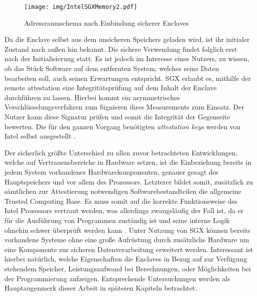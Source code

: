 \begin{figure}
	\texttt{[image: img/IntelSGXMemory2.pdf]}
	\centering
	\caption{Adressraumschema nach Einbindung sicherer Enclaves}
	\label{fig:intelsgxmemory2}
\end{figure}

Da die Enclave selbst aus dem unsicheren Speichers geladen wird, ist ihr initialer Zustand nach außen hin bekannt. Die sichere Verwendung findet folglich erst nach der Initialisierung statt. Es ist jedoch im Interesse eines Nutzers, zu wissen, ob das Stück Software auf dem entfernten System, welches seine Daten bearbeiten soll, auch seinen Erwartungen entspricht. SGX erlaubt es, mithilfe der remote attestation eine Integritätsprüfung auf dem Inhalt der Enclave durchführen zu lassen. Hierbei kommt ein asymmetrisches Verschlüsselungsverfahren zum Signieren ihres Measurements zum Einsatz. Der Nutzer kann diese Signatur prüfen und somit die Integrität der Gegenseite bewerten. Die für den ganzen Vorgang benötigten \textit{attestation keys} werden von Intel selbst ausgestellt \cite{Johnson2016}.

Der sicherlich größte Unterschied zu allen zuvor betrachteten Entwicklungen, welche auf Vertrauensbereiche in Hardware setzen, ist die Einbeziehung bereits in jedem System vorhandener Hardwarekomponenten, genauer gesagt des Hauptspeichers und vor allem des Prozessors. Letzterer bildet somit, zusätzlich zu sämtlichen zur Attestierung notwendigen Softwarebestandteilen die allgemeine Trusted Computing Base. Es muss somit auf die korrekte Funktionsweise des Intel Prozessors vertraut werden, was allerdings zwangsläufig der Fall ist, da er für die Ausführung von Programmen zuständig ist und seine interne Logik ohnehin schwer überprüft werden kann \cite{Aumasson2016}. Unter Nutzung von SGX können bereits vorhandene Systeme ohne eine große Aufrüstung durch zusätzliche Hardware um eine Komponente zur sicheren Datenverarbeitung erweitert werden. Interessant ist hierbei natürlich, welche Eigenschaften die Enclaves in Bezug auf zur Verfügung stehendem Speicher, Leistungsaufwand bei Berechnungen, oder Möglichkeiten bei der Programmierung aufzeigen. Entsprechende Untersuchungen werden als Hauptaugenmerk dieser Arbeit in späteren Kapiteln betrachtet.

